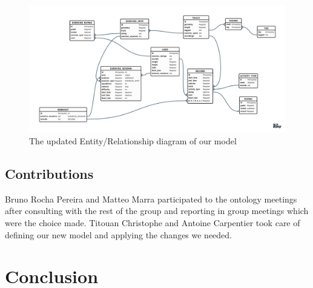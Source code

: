 \documentclass[a4paper]{article}
\begin{document}
\begin{figure}[!H]
  \center
  \includegraphics[width=\textwidth]{er.png}
  \caption{\label{fig:new-er} The updated Entity/Relationship diagram of our model}
\end{figure}

\subsection{Contributions}
Bruno Rocha Pereira and Matteo Marra participated to the ontology meetings after consulting with the rest of the group and reporting in group meetings which were the choice made. 
Titouan Christophe and Antoine Carpentier took care of defining our new model and applying the changes we needed. 
\section{Conclusion}
\end{document}
